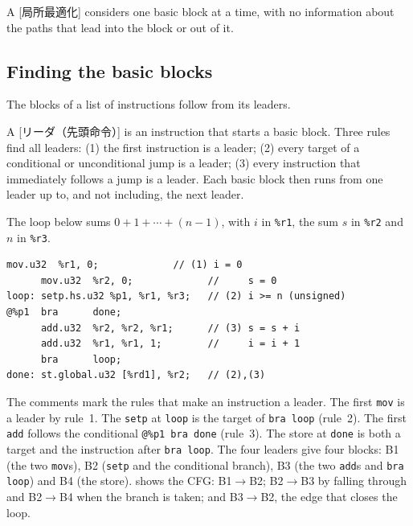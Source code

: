 \documentclass[../main.tex]{subfiles}
\begin{document}
\begin{definition}
  A [局所最適化] considers one basic block at a
  time, with no information about the paths that lead into the block or
  out of it.
\end{definition}

\subsection{Finding the basic blocks}

The blocks of a list of instructions follow from its leaders.

\begin{definition}[Leader]
  A [リーダ（先頭命令）] is an instruction that starts a
  basic block.  Three rules find all leaders: (1) the first instruction
  is a leader; (2) every target of a conditional or unconditional jump
  is a leader; (3) every instruction that immediately follows a jump is
  a leader.  Each basic block then runs from one leader up to, and not
  including, the next leader.
\end{definition}


\begin{example}
  \label{ex:l10-leaders}
  The loop below sums $0+1+\cdots+(n-1)$, with $i$ in \texttt{\%r1},
  the sum $s$ in \texttt{\%r2} and $n$ in \texttt{\%r3}.
\begin{lstlisting}[language=PTX, numbers=none]
      mov.u32  %r1, 0;             // (1) i = 0
      mov.u32  %r2, 0;             //     s = 0
loop: setp.hs.u32 %p1, %r1, %r3;   // (2) i >= n (unsigned)
@%p1  bra      done;
      add.u32  %r2, %r2, %r1;      // (3) s = s + i
      add.u32  %r1, %r1, 1;        //     i = i + 1
      bra      loop;
done: st.global.u32 [%rd1], %r2;   // (2),(3)
\end{lstlisting}
  The comments mark the rules that make an instruction a leader.  The
  first \texttt{mov} is a leader by rule~1.  The \texttt{setp} at
  \texttt{loop} is the target of \texttt{bra loop} (rule~2).  The first
  \texttt{add} follows the conditional \texttt{@\%p1 bra done}
  (rule~3).  The store at \texttt{done} is both a target and the
  instruction after \texttt{bra loop}.  The four leaders give four
  blocks: B1 (the two \texttt{mov}s), B2 (\texttt{setp} and the
  conditional branch), B3 (the two \texttt{add}s and \texttt{bra
  loop}) and B4 (the store).   shows the CFG:
  B1$\to$B2; B2$\to$B3 by falling through and B2$\to$B4 when the
  branch is taken; and B3$\to$B2, the edge that closes the loop.
\end{example}
\end{document}
